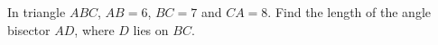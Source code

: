 In triangle $ABC$, $AB=6$, $BC=7$ and $CA=8$. Find the length of the angle bisector $AD$, where $D$ lies on $BC$.
